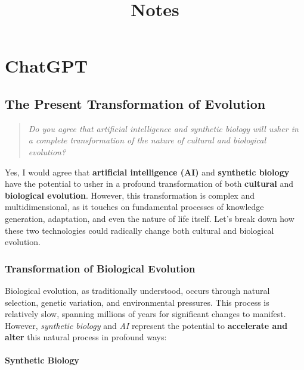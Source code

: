 \documentclass[10pt,titlepage]{book}
\title{\LARGE\bf Notes}
\author{}
\date{}
\begin{document}
\maketitle

\setcounter{tocdepth}{2}
{\parskip-0pt\tableofcontents}

\part{ChatGPT}

\chapter{The Present Transformation of Evolution}

\begin{quote}

\emph{Do you agree that artificial intelligence and synthetic biology will usher in a complete transformation of the nature of cultural and biological evolution?}

\end{quote}

Yes, I would agree that \textbf{artificial intelligence (AI)} and \textbf{synthetic biology} have the potential to usher in a profound transformation of both \textbf{cultural} and \textbf{biological evolution}. However, this transformation is complex and multidimensional, as it touches on fundamental processes of knowledge generation, adaptation, and even the nature of life itself. Let’s break down how these two technologies could radically change both cultural and biological evolution.

\section{Transformation of Biological Evolution}

Biological evolution, as traditionally understood, occurs through natural selection, genetic variation, and environmental pressures. This process is relatively slow, spanning millions of years for significant changes to manifest. However, \textit{synthetic biology} and \textit{AI} represent the potential to \textbf{accelerate and alter} this natural process in profound ways:

\subsection{Synthetic Biology}
\end{document}
